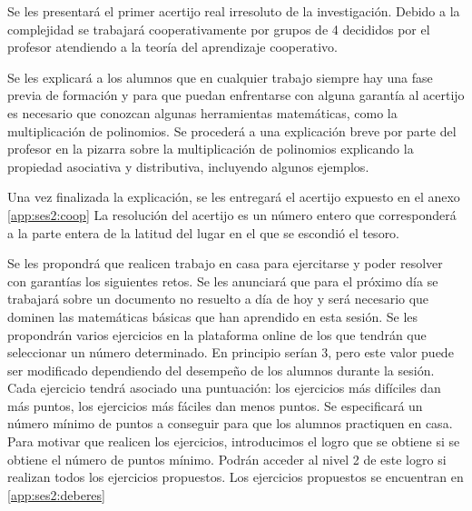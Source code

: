 Se les presentará el primer acertijo real irresoluto de la investigación.
%
Debido a la complejidad se trabajará cooperativamente por grupos de 4 decididos por el profesor atendiendo a la teoría del aprendizaje cooperativo. 

Se les explicará a los alumnos que en cualquier trabajo siempre hay una fase previa de formación y para que puedan enfrentarse con alguna garantía al acertijo es necesario que conozcan algunas herramientas matemáticas, como la multiplicación de polinomios.
%
Se procederá a una explicación breve por parte del profesor en la pizarra sobre la multiplicación de polinomios explicando la propiedad asociativa y distributiva, incluyendo algunos ejemplos.

Una vez finalizada la explicación, se les entregará el acertijo expuesto en el anexo \ref{app:ses2:coop}
%
La resolución del acertijo es un número entero que corresponderá a la parte entera de la latitud del lugar en el que se escondió el tesoro.



Se les propondrá que realicen trabajo en casa para ejercitarse y poder resolver con garantías los siguientes retos.
%
Se les anunciará que para el próximo día se trabajará sobre un documento no resuelto a día de hoy y será necesario que dominen las matemáticas básicas que han aprendido en esta sesión.
%
Se les propondrán varios ejercicios en la plataforma online de los que tendrán que seleccionar un número determinado. 
%
En principio serían 3, pero este valor puede ser modificado dependiendo del desempeño de los alumnos durante la sesión.
%
Cada ejercicio tendrá asociado una puntuación: los ejercicios más difíciles dan más puntos, los ejercicios más fáciles dan menos puntos.
%
Se especificará un número mínimo de puntos a conseguir para que los alumnos practiquen en casa. 
%
Para motivar que realicen los ejercicios, introducimos el logro  que se obtiene si se obtiene el número de puntos mínimo.
%
Podrán acceder al nivel 2 de este logro si realizan todos los ejercicios propuestos.
%
Los ejercicios propuestos se encuentran en \ref{app:ses2:deberes}

